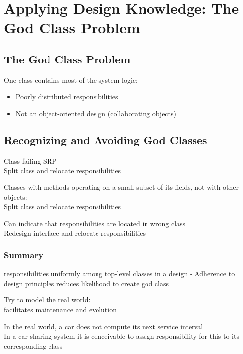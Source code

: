\section{Applying Design Knowledge: The God Class Problem}
\subsection{The God Class Problem}
\begin{defBox}[title=God Classes]
    One class contains most of the system logic:
    \begin{itemize}
        \item Poorly distributed responsibilities
        \item Not an object-oriented design (collaborating objects)
    \end{itemize}
\end{defBox}
\subsection{Recognizing and Avoiding God Classes}
\begin{defBox}[title=Classes with unclear responsibilities]
    Class failing SRP\\
     Split class and relocate responsibilities
\end{defBox}
\begin{defBox}[title=Classes with low cohesion\, non-communicating classes]
    Classes with methods operating on a small subset of its fields, not with other objects: \\
     Split class and relocate responsibilities
\end{defBox}
\begin{defBox}[title=Uses classes with public field accessors]
    Can indicate that responsibilities are located in wrong class\\
     Redesign interface and relocate responsibilities
\end{defBox}
\subsubsection*{Summary}
\begin{defBox}
     responsibilities uniformly among top-level classes in a design - Adherence to design principles reduces likelihood to create god class
\end{defBox}
\begin{defBox}[title=Sometimes design principles need to be traded off]
    Try to model the real world:\\
     facilitates maintenance and evolution\\
\end{defBox}
\begin{defBox}[title=Example(Car)]
    In the real world, a car does not compute its next service interval\\
    In a car sharing system it is conceivable to assign responsibility for this to its corresponding class
\end{defBox}
